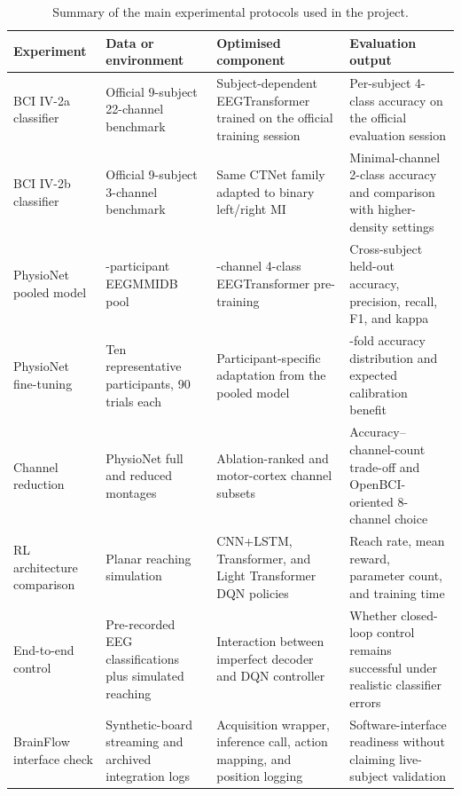 \documentclass[12pt, a4paper]{article}
\begin{document}
\begin{table}[htbp]
\centering
\caption{Summary of the main experimental protocols used in the project.}
\label{tab:protocol_summary}
\small
\begin{tabular}{@{} >{\raggedright\arraybackslash}p{3.0cm} >{\raggedright\arraybackslash}p{3.1cm} >{\raggedright\arraybackslash}p{3.5cm} >{\raggedright\arraybackslash}p{3.5cm} @{}}
\toprule
\textbf{Experiment} & \textbf{Data or environment} & \textbf{Optimised component} & \textbf{Evaluation output} \\
\midrule
BCI IV-2a classifier & Official 9-subject 22-channel benchmark & Subject-dependent EEGTransformer trained on the official training session & Per-subject 4-class accuracy on the official evaluation session \\
BCI IV-2b classifier & Official 9-subject 3-channel benchmark & Same CTNet family adapted to binary left/right MI & Minimal-channel 2-class accuracy and comparison with higher-density settings \\
PhysioNet pooled model & 109-participant EEGMMIDB pool & 64-channel 4-class EEGTransformer pre-training & Cross-subject held-out accuracy, precision, recall, F1, and kappa \\
PhysioNet fine-tuning & Ten representative participants, 90 trials each & Participant-specific adaptation from the pooled model & 5-fold accuracy distribution and expected calibration benefit \\
Channel reduction & PhysioNet full and reduced montages & Ablation-ranked and motor-cortex channel subsets & Accuracy--channel-count trade-off and OpenBCI-oriented 8-channel choice \\
RL architecture comparison & Planar reaching simulation & CNN+LSTM, Transformer, and Light Transformer DQN policies & Reach rate, mean reward, parameter count, and training time \\
End-to-end control & Pre-recorded EEG classifications plus simulated reaching & Interaction between imperfect decoder and DQN controller & Whether closed-loop control remains successful under realistic classifier errors \\
BrainFlow interface check & Synthetic-board streaming and archived integration logs & Acquisition wrapper, inference call, action mapping, and position logging & Software-interface readiness without claiming live-subject validation \\
\bottomrule
\end{tabular}
\end{table}
\end{document}

